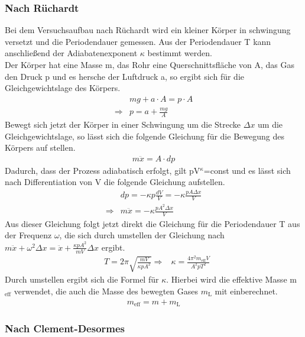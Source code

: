 \documentclass[12pt,a4paper,titlepage,headinclude,bibtotoc]{scrartcl}
\begin{document}
\subsubsection{Nach Rüchardt}
Bei dem Versuchsaufbau nach Rüchardt wird ein kleiner Körper in schwingung versetzt und die Periodendauer gemessen.
Aus der Periodendauer T kann anschließend der Adiabatenexponent $\kappa$ bestimmt werden.\\
Der Körper hat eine Masse m, das Rohr eine Querschnittsfläche von A, das Gas den Druck p und es hersche der Luftdruck a, so ergibt sich für die Gleichgewichtslage des Körpers.
\begin{align}
	& mg + a\cdot A = p \cdot A\\
	\Rightarrow & p=a+\frac{mg}{A}
\end{align}
Bewegt sich jetzt der Körper in einer Schwingung um die Strecke $\Delta x$ um die Gleichgewichtslage, so lässt sich die folgende Gleichung für die Bewegung des Körpers auf stellen.
\begin{align}
	m\ddot{x}=A\cdot dp
\end{align}
Dadurch, dass der Prozess adiabatisch erfolgt, gilt pV$^\kappa$=const und es lässt sich nach Differentiation von V die folgende Gleichung aufstellen.
\begin{align}
	& dp=-\kappa p \frac{dV}{V}=-\kappa \frac{pA\Delta x}{V}\\
	\Rightarrow & m \ddot{x}=-\kappa\frac{pA^2\Delta x}{V}
\end{align}
Aus dieser Gleichung folgt jetzt direkt die Gleichung für die Periodendauer T aus der Frequenz $\omega$, die sich durch umstellen der Gleichung nach $m\ddot{x}+\omega^2 \Delta x=\ddot{x} + \frac{\kappa pA^2}{mV}\Delta x$ ergibt.
\begin{align}
	& T = 2\pi\sqrt{\frac{mV}{\kappa pA^2}}
	\Rightarrow & \kappa = \frac{4\pi^2m_\text{eff}V}{A^2pT^2}
\end{align}
Durch umstellen ergibt sich die Formel für $\kappa$.
Hierbei wird die effektive Masse m$_\text{eff}$ verwendet, die auch die Masse des bewegten Gases $m_\text{L}$ mit einberechnet.
\begin{align}
	m_\text{eff} = m + m_\text{L}
\end{align}

\subsubsection{Nach Clement-Desormes}

\cite[S.$\infty$]{prakti}
\end{document}

